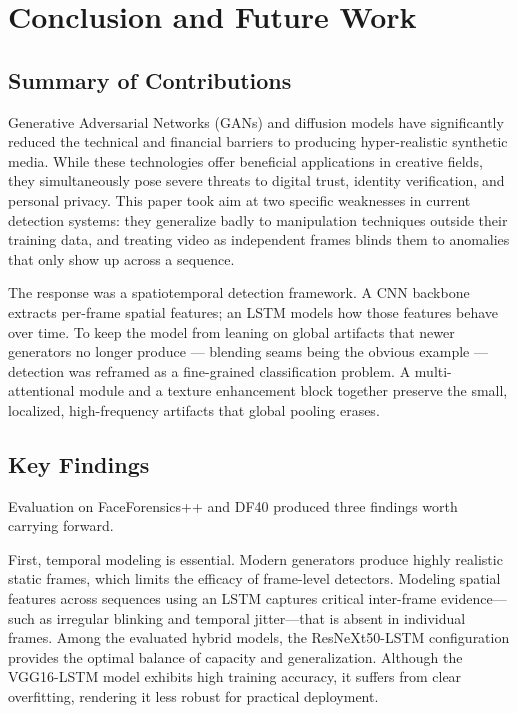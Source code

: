 \section{Conclusion and Future Work}
\label{sec:conclusion}

\subsection{Summary of Contributions}
Generative Adversarial Networks (GANs) and diffusion models have significantly reduced the technical and financial barriers to producing hyper-realistic synthetic media. While these technologies offer beneficial applications in creative fields, they simultaneously pose severe threats to digital trust, identity verification, and personal privacy. This paper took aim at two specific weaknesses in current detection systems: they generalize badly to manipulation techniques outside their training data, and treating video as independent frames blinds them to anomalies that only show up across a sequence.

The response was a spatiotemporal detection framework. A CNN backbone extracts per-frame spatial features; an LSTM models how those features behave over time. To keep the model from leaning on global artifacts that newer generators no longer produce — blending seams being the obvious example — detection was reframed as a fine-grained classification problem. A multi-attentional module and a texture enhancement block together preserve the small, localized, high-frequency artifacts that global pooling erases.

\subsection{Key Findings}
Evaluation on FaceForensics++ and DF40 produced three findings worth carrying forward.

First, temporal modeling is essential. Modern generators produce highly realistic static frames, which limits the efficacy of frame-level detectors. Modeling spatial features across sequences using an LSTM captures critical inter-frame evidence—such as irregular blinking and temporal jitter—that is absent in individual frames. Among the evaluated hybrid models, the ResNeXt50-LSTM configuration provides the optimal balance of capacity and generalization. Although the VGG16-LSTM model exhibits high training accuracy, it suffers from clear overfitting, rendering it less robust for practical deployment.


